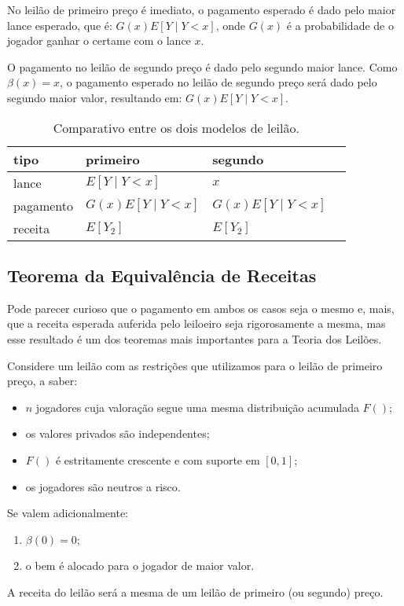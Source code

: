 No leilão de primeiro preço é imediato, o pagamento esperado é dado pelo maior lance esperado, que é: $G(x)E\left[ Y \mid Y<x \right]$, onde $G(x)$ é a probabilidade de o jogador ganhar o certame com o lance $x$.

O pagamento no leilão de segundo preço é dado pelo segundo maior lance. Como $\beta(x) = x$, o pagamento esperado no leilão de segundo preço será dado pelo segundo maior valor, resultando em: $G(x)E\left[ Y \mid Y<x \right]$.

\begin{table}[]
	\centering
	\begin{tabular}{@{}llll@{}}
		\toprule
		tipo      & primeiro 					     & segundo      					\\ \midrule
		lance     & $E\left[ Y \mid Y<x \right]$     & $x$             					\\
		pagamento & $G(x)E\left[ Y \mid Y<x \right]$ & $G(x)E\left[ Y \mid Y<x \right]$ \\
		receita   & $E\left[ Y_2 \right]$            & $E\left[ Y_2 \right]$            \\
	\end{tabular}
	\caption{Comparativo entre os dois modelos de leilão.}
	\label{tab:tabela1}
\end{table}

\subsection{Teorema da Equivalência de Receitas}

Pode parecer curioso que o pagamento em ambos os casos seja o mesmo e, mais, que a receita esperada auferida pelo leiloeiro seja rigorosamente a mesma, mas esse resultado é um dos teoremas mais importantes para a Teoria dos Leilões.

\begin{teorema}
	\label{teorema:equivalencia_de_receitas}
	Considere um leilão com as restrições que utilizamos para o leilão de primeiro preço, a saber:
	\begin{itemize}
		\item $n$ jogadores cuja valoração segue uma mesma distribuição acumulada $F()$;
		\item os valores privados são independentes;
		\item $F()$ é estritamente crescente e com suporte em $[0,1]$;
		\item os jogadores são neutros a risco.
	\end{itemize}
	Se valem adicionalmente:
	\begin{enumerate}
		\item $\beta(0) = 0$;
		\item o bem é alocado para o jogador de maior valor.
	\end{enumerate}
	A receita do leilão será a mesma de um leilão de primeiro (ou segundo) preço.
\end{teorema}

